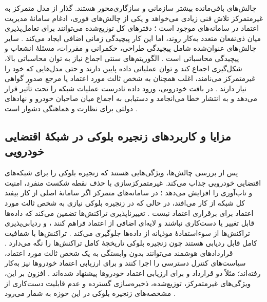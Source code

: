 \documentclass[12pt,a4paper]{article}
\begin{document}
چالش‌های باقی‌مانده بیشتر سازمانی و سازگاری‌محور هستند. گذار از مدل متمرکز به غیرمتمرکز تلاش فنی زیادی می‌خواهد و یکی از چالش‌های فوری، ادغام سامانهٔ مدیریت اعتماد در سامانه‌های موجود است \cite{razaBlockchainBasedReputationTrust2024}؛ دفتر‌های کل توزیع‌شده می‌توانند برای تعامل‌پذیری میان ذی‌نفعان متعدد به‌کار روند، اما این کار پیچیدگی زمانی اضافی ایجاد می‌کند \cite{farsimadanReviewSecurityChallenges2025}. سایر چالش‌های عنوان‌شده شامل پیچیدگی طراحی، حکمرانی و مقررات، مسئلهٔ انشعاب و پیچیدگی محاسباتی است \cite{razaBlockchainBasedReputationTrust2024}. الگوریتم‌های سنتی اجماع نیاز به توان محاسباتی بالا، شکل‌گیری اجماع کند و توان عملیاتی داده پایین دارند \cite{razaBlockchainBasedReputationTrust2024} و حتی مدل‌هایی که خود را غیرمتمرکز می‌نامند، اغلب همچنان به شخص ثالث مورد اعتماد یا مرجع صدور گواهی نیاز دارند \cite{razaBlockchainBasedReputationTrust2024}. در بافت خودرویی، ورود داده نادرست عملیات شبکه را تحت تأثیر قرار می‌دهد و به انتشار خطا می‌انجامد \cite{razaBlockchainBasedReputationTrust2024} و دستیابی به اجماع میان صاحبان خودرو و نهاد‌های دولتی برای نظارت و هماهنگی دشوار است \cite{razaBlockchainBasedReputationTrust2024}.

\subsection{مزایا و کاربرد‌های زنجیره بلوکی در شبکهٔ اقتضایی خودرویی}

پس از بررسی چالش‌ها، ویژگی‌هایی هستند که زنجیره بلوکی را برای شبکه‌های اقتضایی خودرویی جذاب می‌کند. غیرمتمرکزسازی با حذف نقطه شکست منفرد، امنیت و تاب‌آوری را افزایش می‌دهد \cite{razaBlockchainBasedReputationTrust2024}؛ در سامانه‌های متمرکز اگر سامانهٔ اصلی از کار بیفتد کل شبکه از کار می‌افتد، در حالی که در زنجیره بلوکی نیازی به شخص ثالث مورد اعتماد برای برقراری اعتماد نیست \cite{ghovanlooyghajarSBTMSScalableBlockchain2021}. تغییرناپذیری تراکنش‌ها تضمین می‌کند که داده‌ها قابل تغییر یا دست‌کاری نباشند و لایه‌ای اضافی از اعتماد فراهم کنند \cite{razaBlockchainBasedReputationTrust2024}، و ردیابی‌پذیری تراکنش‌ها از سوءاستفادهٔ موذیانه از داده‌ها جلوگیری می‌کند \cite{razaBlockchainBasedReputationTrust2024}. تراکنش‌ها با شفافیت کامل قابل ردیابی هستند چون زنجیره بلوکی تاریخچهٔ کامل تراکنش‌ها را نگه می‌دارد \cite{razaBlockchainBasedReputationTrust2024}. قرارداد‌های هوشمند می‌توانند بدون وابستگی به یک شخص ثالث مورد اعتماد، سیاست‌های کنترل دسترسی را اجرا کنند \cite{razaBlockchainBasedReputationTrust2024} و برای ارزیابی اعتماد خودرو‌ها نیز به‌کار رفته‌اند؛ مثلاً دو قرارداد  و  برای ارزیابی اعتماد خودرو‌ها پیشنهاد شده‌اند \cite{razaBlockchainBasedReputationTrust2024}. افزون بر این، ویژگی‌های غیرمتمرکز، توزیع‌شده، ذخیره‌سازی گسترده و عدم قابلیت دست‌کاری از مشخصه‌های زنجیره بلوکی در این حوزه به شمار می‌رود \cite{ghovanlooyghajarSBTMSScalableBlockchain2021}.
\end{document}

